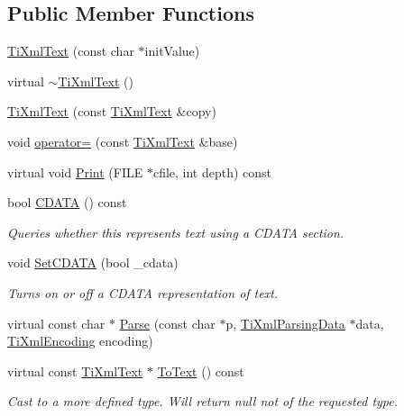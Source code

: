 \subsection*{Public Member Functions}
\begin{DoxyCompactItemize}
\item 
\hyperlink{class_ti_xml_text_af659e77c6b87d684827f35a8f4895960}{TiXmlText} (const char $\ast$initValue)
\item 
virtual \hyperlink{class_ti_xml_text_a829a4bd2d8d2461c333eb4f3f5b1b3d2}{$\sim$TiXmlText} ()
\item 
\hyperlink{class_ti_xml_text_a8d2cc1b4af2208cbb0171cf20f6815d1}{TiXmlText} (const \hyperlink{class_ti_xml_text}{TiXmlText} \&copy)
\item 
void \hyperlink{class_ti_xml_text_af5f15d40d048cea7cab9d0eb4fd8a7d2}{operator=} (const \hyperlink{class_ti_xml_text}{TiXmlText} \&base)
\item 
virtual void \hyperlink{class_ti_xml_text_ae74d56c5b3ddec6cc3103dd51821af92}{Print} (FILE $\ast$cfile, int depth) const 
\item 
bool \hyperlink{class_ti_xml_text_ad1a6a6b83fa2271022dd97c072a2b586}{CDATA} () const 
\begin{DoxyCompactList}\small\item\em Queries whether this represents text using a CDATA section. \item\end{DoxyCompactList}\item 
void \hyperlink{class_ti_xml_text_acb17ff7c5d09b2c839393445a3de5ea9}{SetCDATA} (bool \_\-cdata)
\begin{DoxyCompactList}\small\item\em Turns on or off a CDATA representation of text. \item\end{DoxyCompactList}\item 
virtual const char $\ast$ \hyperlink{class_ti_xml_text_a8d2dcfa41fc73d3e62dacc2fcf633819}{Parse} (const char $\ast$p, \hyperlink{class_ti_xml_parsing_data}{TiXmlParsingData} $\ast$data, \hyperlink{tinyxml_8h_a88d51847a13ee0f4b4d320d03d2c4d96}{TiXmlEncoding} encoding)
\item 
virtual const \hyperlink{class_ti_xml_text}{TiXmlText} $\ast$ \hyperlink{class_ti_xml_text_a895bf34ffad17f7439ab2a52b9651648}{ToText} () const 
\begin{DoxyCompactList}\small\item\em Cast to a more defined type. Will return null not of the requested type. \item\end{DoxyCompactList}\item 

\end{DoxyCompactItemize}
